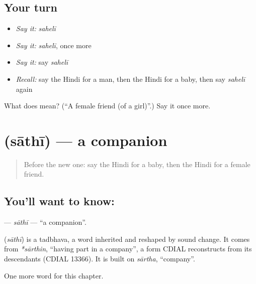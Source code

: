 \subsection*{Your turn}
\begin{itemize}
\raggedright
  \item \emph{Say it:} \emph{sahelī}
  \item \emph{Say it:} \emph{sahelī}, once more
  \item \emph{Say it:} say \emph{sahelī}
  \item \emph{Recall:} say the Hindi for a man, then the Hindi for a baby, then say \emph{sahelī} again
\end{itemize}

\begin{tcolorbox}[breakable,colback=teal!4,colframe=teal!35!black,title={Before you move on}]
What does  mean? (\textquotedblleft{}A female friend (of a girl)\textquotedblright{}.) Say it once more.
\end{tcolorbox}
\section[\texorpdfstring{\hi{साथी} (sāthī)}{साथी (sāthī)}]{ (sāthī) — a companion}

\label{lesson:HI-C254-sathi}



\begin{quote}
Before the new one: say the Hindi for a baby, then the Hindi for a female friend.
\end{quote}

\subsection*{You'll want to know: }
\textbf{} — \emph{sāthī} — \textquotedblleft{}a companion\textquotedblright{}.

\begin{cousinweb}
\textbf{} (\emph{sāthī}) is a tadbhava, a word inherited and reshaped by sound change. It comes from \emph{*sārthin}, \textquotedblleft{}having part in a company\textquotedblright{}, a form CDIAL reconstructs from its descendants (CDIAL 13366). It is built on \emph{sārtha}, \textquotedblleft{}company\textquotedblright{}.
\end{cousinweb}

\begin{grammarlens}[title={What you've built}]
One more word for this chapter.
\end{grammarlens}

